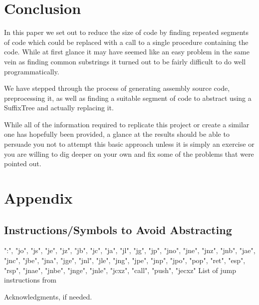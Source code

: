 \documentclass[9pt,nocopyrightspace]{sigplanconf}
\begin{document}
\section{Conclusion}

In this paper we set out to reduce the size of code by finding repeated segments of code which could be replaced with a call to a single procedure containing the code.
While at first glance it may have seemed like an easy problem in the same vein as finding common substrings it turned out to be fairly difficult to do well programmatically.

We have stepped through the process of generating assembly source code, preprocessing it, as well as finding a suitable segment of code to abstract using a SuffixTree and actually replacing it.

While all of the information required to replicate this project or create a similar one has hopefully been provided, a glance at the results should be able to persuade you not to attempt this basic approach unless it is simply an exercise or you are willing to dig deeper on your own and fix some of the problems that were pointed out.

\appendix
\section{Appendix}

\subsection{Instructions/Symbols to Avoid Abstracting}
":", "jo", "js", "je", "jz", "jb", "jc", "ja", "jl", "jg", "jp", "jno", "jne", "jnz", "jnb", "jae", "jnc", "jbe", "jna", "jge", "jnl", "jle", "jng", "jpe", "jnp", "jpo", "pop", "ret", "esp", "rsp", "jnae", "jnbe", "jnge", "jnle", "jcxz", "call", "push", "jecxz"
List of jump instructions from \cite{intel01}

\acks

Acknowledgments, if needed.




\end{document}
